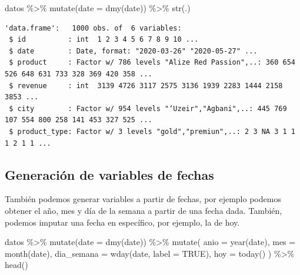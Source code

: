 \documentclass[
  letterpaper,
  DIV=11,
  numbers=noendperiod]{scrreprt}
\newenvironment{Shaded}{\begin{snugshade}}{\end{snugshade}}
\newcommand{\AttributeTok}[1]{\textcolor[rgb]{0.40,0.45,0.13}{#1}}
\newcommand{\ConstantTok}[1]{\textcolor[rgb]{0.56,0.35,0.01}{#1}}
\newcommand{\FunctionTok}[1]{\textcolor[rgb]{0.28,0.35,0.67}{#1}}
\newcommand{\NormalTok}[1]{\textcolor[rgb]{0.00,0.23,0.31}{#1}}
\newcommand{\SpecialCharTok}[1]{\textcolor[rgb]{0.37,0.37,0.37}{#1}}
\begin{document}
\begin{Shaded}
\begin{Highlighting}[]
\NormalTok{datos }\SpecialCharTok{\%\textgreater{}\%} 
  \FunctionTok{mutate}\NormalTok{(}\AttributeTok{date =} \FunctionTok{dmy}\NormalTok{(date)) }\SpecialCharTok{\%\textgreater{}\%} 
  \FunctionTok{str}\NormalTok{(.)}
\end{Highlighting}
\end{Shaded}

\begin{verbatim}
'data.frame':   1000 obs. of  6 variables:
 $ id          : int  1 2 3 4 5 6 7 8 9 10 ...
 $ date        : Date, format: "2020-03-26" "2020-05-27" ...
 $ product     : Factor w/ 786 levels "Alize Red Passion",..: 360 654 526 648 631 733 328 369 420 358 ...
 $ revenue     : int  3139 4726 3117 2575 3136 1939 2283 1444 2158 3853 ...
 $ city        : Factor w/ 954 levels "‘Uzeir","Agbani",..: 445 769 107 554 800 258 141 453 327 525 ...
 $ product_type: Factor w/ 3 levels "gold","premiun",..: 2 3 NA 3 1 1 1 2 1 1 ...
\end{verbatim}

\hypertarget{generaciuxf3n-de-variables-de-fechas}{%
\subsection{Generación de variables de
fechas}\label{generaciuxf3n-de-variables-de-fechas}}

También podemos generar variables a partir de fechas, por ejemplo
podemos obtener el año, mes y día de la semana a partir de una fecha
dada. También, podemos imputar una fecha en específico, por ejemplo, la
de hoy.

\begin{Shaded}
\begin{Highlighting}[]
\NormalTok{datos }\SpecialCharTok{\%\textgreater{}\%} 
  \FunctionTok{mutate}\NormalTok{(}\AttributeTok{date =} \FunctionTok{dmy}\NormalTok{(date)) }\SpecialCharTok{\%\textgreater{}\%} 
  \FunctionTok{mutate}\NormalTok{(}
    \AttributeTok{anio =} \FunctionTok{year}\NormalTok{(date),}
    \AttributeTok{mes =} \FunctionTok{month}\NormalTok{(date),}
    \AttributeTok{dia\_semana =} \FunctionTok{wday}\NormalTok{(date, }\AttributeTok{label =} \ConstantTok{TRUE}\NormalTok{),}
    \AttributeTok{hoy =} \FunctionTok{today}\NormalTok{()}
\NormalTok{  ) }\SpecialCharTok{\%\textgreater{}\%} 
  \FunctionTok{head}\NormalTok{()}
\end{Highlighting}
\end{Shaded}
\end{document}
